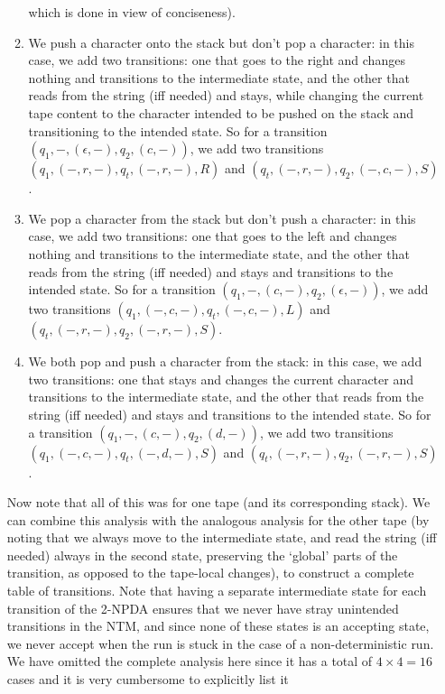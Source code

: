 \begin{soln}
\begin{enumerate}
\begin{enumerate}
                    which is done in view of conciseness).
                \item We push a character onto the stack but don't pop a character: in this case, we add two transitions: one that goes to the right and changes nothing and transitions to the
                    intermediate state, and the other that reads from the string (iff needed) and stays, while changing the current tape content to the character intended to be pushed on the stack and
                    transitioning to the intended state. So for a transition $(q_1, -, (\epsilon, -), q_2, (c, -))$, we add two transitions $(q_1, (-, r, -), q_t, (-, r, -), R)$ and $(q_t,
                    (-, r, -), q_2, (-, c, -), S)$.
                \item We pop a character from the stack but don't push a character: in this case, we add two transitions: one that goes to the left and changes nothing and transitions to the
                    intermediate state, and the other that reads from the string (iff needed) and stays and transitions to the intended state. So for a transition $(q_1, -, (c, -), q_2,
                    (\epsilon, -))$, we add two transitions $(q_1, (-, c, -), q_t, (-, c, -), L)$ and $(q_t, (-, r, -), q_2, (-, r, -), S)$.
                \item We both pop and push a character from the stack: in this case, we add two transitions: one that stays and changes the current character and transitions to the
                    intermediate state, and the other that reads from the string (iff needed) and stays and transitions to the intended state. So for a transition $(q_1, -, (c, -), q_2, (d,
                    -))$, we add two transitions $(q_1, (-, c, -), q_t, (-, d, -), S)$ and $(q_t, (-, r, -), q_2, (-, r, -), S)$.
            \end{enumerate}
            Now note that all of this was for one tape (and its corresponding stack). We can combine this analysis with the analogous analysis for the other tape (by noting that we always move to
            the intermediate state, and read the string (iff needed) always in the second state, preserving the `global' parts of the transition, as opposed to the tape-local changes), to
            construct a complete table of transitions. Note that having a separate intermediate state for each transition of the 2-NPDA ensures that we never have stray unintended transitions
            in the NTM, and since none of
            these states is an accepting state, we never accept when the run is stuck in the case of a non-deterministic run. We have omitted the complete analysis here since it has a total of $4 \times 4 = 16$ cases and it is very cumbersome to explicitly list it

\end{enumerate}
\end{soln}

